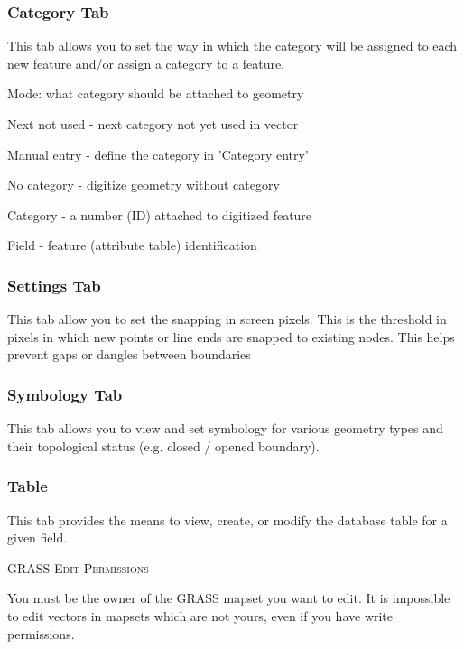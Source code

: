 \documentclass[10pt,english]{article}
\newcommand\qgistip[1]{\raggedright\small{#1}}
\begin{document}
\begin{onehalfspace}
\subsubsection{Category Tab}
This tab allows you to set the way in which the category will be assigned to each new feature and/or assign a category to a feature.
\begin{compactitem}
\item Mode: what category should be attached to geometry
\begin{compactitem}
\item Next not used - next category not yet used in vector
\item Manual entry - define the category in 'Category entry'
\item No category - digitize geometry without category
\end{compactitem}
\item Category - a number (ID) attached to digitized feature
\item Field - feature (attribute table) identification
\end{compactitem}
\subsubsection{Settings Tab} 
This tab allow you to set the snapping in screen pixels. This is the threshold in pixels in which new points or line ends are snapped to existing nodes. This helps prevent gaps or dangles between boundaries

\subsubsection{Symbology Tab}
This tab allows you to view and set symbology for various geometry types and their topological status (e.g. closed / opened boundary).

\subsubsection{Table} 
This tab provides the means to view, create, or modify the database table for a given field.
\begin{Tip}\caption{\textsc{GRASS Edit Permissions}}
\qgistip{You must be the owner of the GRASS mapset you want to edit. It is impossible to edit vectors in mapsets which are not yours, even if you have write permissions.
}
\end{Tip} 


\end{onehalfspace}
\end{document}
